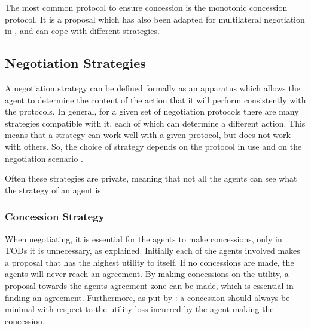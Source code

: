 The most common protocol to ensure concession is the monotonic concession protocol. It is a proposal which has also been adapted for multilateral negotiation in \citep{endriss2006monotonic}, and can cope with different strategies.

\subsection{Negotiation Strategies}
A negotiation strategy can be defined formally as an apparatus which allows the agent to determine the content of the action that it will perform consistently with the protocols. In general, for a given set of negotiation protocols there are many strategies compatible with it, each of which can determine a different action. This means that a strategy can work well with a given protocol, but does not work with others. So, the choice of strategy depends on the protocol in use and on the negotiation scenario \citep{di2015multi}.

Often these strategies are private, meaning that not all the agents can see what the strategy of an agent is \citep{fatima2004agenda}. 

\subsubsection{Concession Strategy}
\label{sec:concessionstrat}
When negotiating, it is essential for the agents to make concessions, only in TODs it is unnecessary, as explained. Initially each of the agents involved makes a proposal that has the highest utility to itself. If no concessions are made, the agents will never reach an agreement. By making concessions on the utility, a proposal towards the agents agreement-zone can be made, which is essential in finding an agreement. Furthermore, as put by \citet{endriss2006monotonic}: a concession should always be minimal with respect to the utility loss incurred by the agent making the concession.

